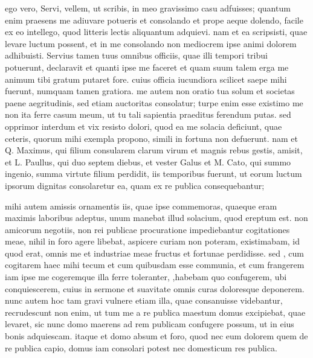 


 ego vero, Servi, vellem, ut scribis, in meo gravissimo casu adfuisses; quantum enim praesens me adiuvare potueris et consolando et prope aeque dolendo, facile ex eo intellego, quod litteris lectis aliquantum adquievi. nam et ea scripsisti, quae levare luctum possent, et in me consolando non mediocrem ipse animi dolorem adhibuisti. Servius tamen tuus omnibus officiis, quae illi tempori tribui potuerunt, declaravit et quanti ipse me faceret et quam suum talem erga me animum tibi gratum putaret fore. cuius officia iucundiora scilicet saepe mihi fuerunt, numquam tamen gratiora. me autem non oratio tua solum et societas paene aegritudinis, sed etiam auctoritas consolatur; turpe enim esse existimo me non ita ferre casum meum, ut tu tali sapientia praeditus ferendum putas. sed opprimor interdum et vix resisto dolori, quod ea me solacia deficiunt, quae ceteris, quorum mihi exempla propono, simili in fortuna non defuerunt. nam et Q. Maximus, qui filium consularem clarum virum et magnis rebus gestis, amisit, et L. Paullus, qui duo septem diebus, et vester Galus et M. Cato, qui summo ingenio, summa virtute filium perdidit, iis temporibus fuerunt, ut eorum luctum ipsorum dignitas consolaretur ea, quam ex re publica consequebantur;

 mihi autem amissis ornamentis iis, quae ipse commemoras, quaeque eram maximis laboribus adeptus, unum manebat illud solacium, quod ereptum est. non amicorum negotiis, non rei publicae procuratione impediebantur cogitationes meae, nihil in foro agere libebat, aspicere curiam non poteram, existimabam, id quod erat, omnis me et industriae meae fructus et fortunae perdidisse. sed , cum cogitarem haec mihi tecum et cum quibusdam esse communia, et cum frangerem iam ipse me cogeremque illa ferre toleranter, ,habebam quo confugerem, ubi conquiescerem, cuius in sermone et suavitate omnis curas doloresque deponerem. nunc autem hoc tam gravi vulnere etiam illa, quae consanuisse videbantur, recrudescunt non enim, ut tum me a re publica maestum domus excipiebat, quae levaret, sic nunc domo maerens ad rem publicam confugere possum, ut in eius bonis adquiescam. itaque et domo absum et foro, quod nec eum dolorem quem de re publica capio, domus iam consolari potest nec domesticum res publica.

